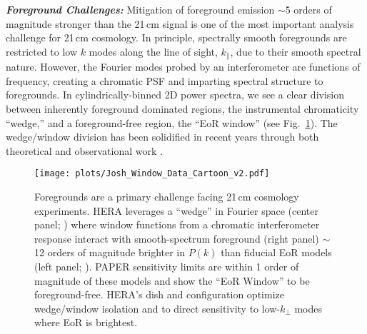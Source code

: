 \documentclass[preprint,11pt]{aastex}
\begin{document}
\noindent \textbf{\textit{Foreground Challenges:}}
Mitigation of foreground emission $\sim$5 orders of magnitude stronger than the 21\,cm signal is one of the most important
analysis challenge for 21\,cm cosmology. 
In principle,
spectrally smooth foregrounds are restricted to low $k$ modes along the line of
sight, $k_\|$, due to their smooth spectral nature. However, the Fourier modes probed by an
interferometer are functions of frequency, creating a chromatic PSF and imparting spectral structure to foregrounds.
In cylindrically-binned 2D power spectra, 
we see a clear division between inherently foreground dominated regions,
the instrumental chromaticity ``wedge,'' and a foreground-free region, the
``EoR window'' (see Fig.~\ref{fig:WedgeCartoon}). 
The wedge/window division has been solidified in recent years
through both theoretical and observational work
\citep{morales_et_al2012,parsons_et_al2012b,vedantham_2012,Datta_2010,hazelton_et_al2013,pober_et_al2013,liu_et_al2014a,liu_et_al2014b}. 

\begin{figure}[tbh!]
	\centering
	\vspace{-10pt}
	\texttt{[image: plots/Josh\_Window\_Data\_Cartoon\_v2.pdf]}
	\vspace{-25pt}
	\caption{Foregrounds are a primary challenge facing 21\,cm cosmology experiments. 
HERA leverages a
``wedge'' in Fourier space (center panel; \citealt{dillon_et_al2015}) where window functions from a
chromatic interferometer response interact with smooth-spectrum foreground (right panel) $\sim$12 orders of magnitude brighter
in $P(k)$
than fiducial EoR models (left panel; \citealt{mesinger_et_al2011}).
PAPER sensitivity limits are within 1 order
of magnitude of these models \citep{ali_et_al2015} and show the ``EoR Window'' to be foreground-free.
HERA's dish and configuration optimize wedge/window isolation and
to direct sensitivity to low-$k_\perp$ modes where EoR is brightest.
}	\label{fig:WedgeCartoon}
\vspace{-12pt}
\end{figure}
\end{document}
